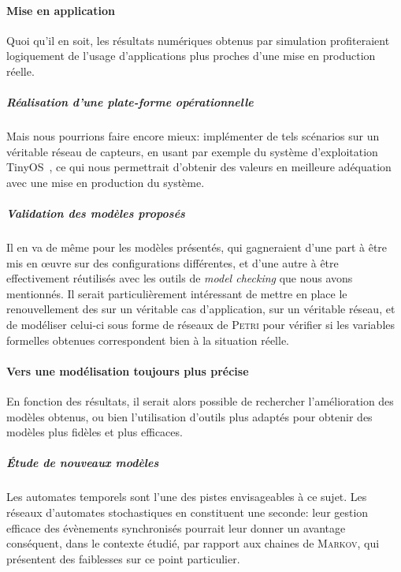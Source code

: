     \vspace{1em}
    \paragraph{Mise en application}
Quoi qu'il en soit, les résultats numériques obtenus par simulation profiteraient logiquement de l'usage d'applications plus proches d'une mise en production réelle.

        \vspace{-1em}
        \subparagraph{Réalisation d'une plate-forme opérationnelle}
Mais nous pourrions faire encore mieux: implémenter de tels scénarios sur un véritable réseau de capteurs, en usant par exemple du système d'exploitation TinyOS~\cite{tinyos}, ce qui nous permettrait d'obtenir des valeurs en meilleure adéquation avec une mise en production du système.

        \vspace{-1em}
        \subparagraph{Validation des modèles proposés}
Il en va de même pour les modèles présentés, qui gagneraient d'une part à être mis en œuvre sur des configurations différentes, et d'une autre à être effectivement réutilisés avec les outils de \textit{model checking} que nous avons mentionnés.
Il serait particulièrement intéressant de mettre en place le renouvellement des \cnst sur un véritable cas d'application, sur un véritable réseau, et de modéliser celui-ci sous forme de réseaux de \textsc{Petri} pour vérifier si les variables formelles obtenues correspondent bien à la situation réelle.

    \vspace{1em}
    \paragraph{Vers une modélisation toujours plus précise}
En fonction des résultats, il serait alors possible de rechercher l'amélioration des modèles obtenus, ou bien l'utilisation d'outils plus adaptés pour obtenir des modèles plus fidèles et plus efficaces.
        \vspace{-1em}
        \subparagraph{Étude de nouveaux modèles}
Les automates temporels sont l'une des pistes envisageables à ce sujet.
Les réseaux d'automates stochastiques en constituent une seconde: leur gestion efficace des évènements synchronisés pourrait leur donner un avantage conséquent, dans le contexte étudié, par rapport aux chaines de \textsc{Markov}, qui présentent des faiblesses sur ce point particulier.

